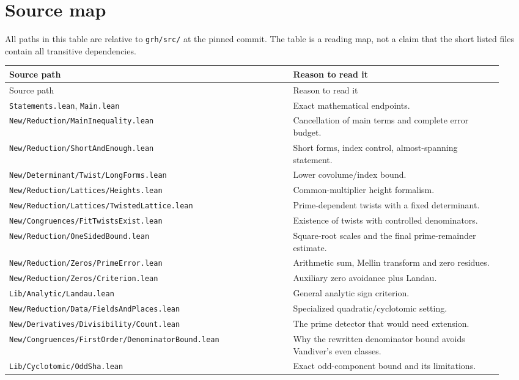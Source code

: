 \documentclass[11pt,letterpaper]{article}
\theoremstyle{definition}\newtheorem{definition}[theorem]{Definition}
\theoremstyle{remark}\newtheorem{remark}[theorem]{Remark}
\newcommand{\src}[1]{\nolinkurl{#1}}
\begin{document}
\appendix
\section{Source map}
All paths in this table are relative to \src{grh/src/} at the pinned commit. The table is a
reading map, not a claim that the short listed files contain all transitive dependencies.
\begin{longtable}{P{0.54\linewidth}P{0.40\linewidth}}
\toprule Source path & Reason to read it\\\midrule\endfirsthead
\toprule Source path & Reason to read it\\\midrule\endhead
\src{Statements.lean}, \src{Main.lean} & Exact mathematical endpoints.\\[4pt]
\src{New/Reduction/MainInequality.lean} & Cancellation of main terms and complete error budget.\\[4pt]
\src{New/Reduction/ShortAndEnough.lean} & Short forms, index control, almost-spanning statement.\\[4pt]
\src{New/Determinant/Twist/LongForms.lean} & Lower covolume/index bound.\\[4pt]
\src{New/Reduction/Lattices/Heights.lean} & Common-multiplier height formalism.\\[4pt]
\src{New/Reduction/Lattices/TwistedLattice.lean} & Prime-dependent twists with a fixed determinant.\\[4pt]
\src{New/Congruences/FitTwistsExist.lean} & Existence of twists with controlled denominators.\\[4pt]
\src{New/Reduction/OneSidedBound.lean} & Square-root scales and the final prime-remainder estimate.\\[4pt]
\src{New/Reduction/Zeros/PrimeError.lean} & Arithmetic sum, Mellin transform and zero residues.\\[4pt]
\src{New/Reduction/Zeros/Criterion.lean} & Auxiliary zero avoidance plus Landau.\\[4pt]
\src{Lib/Analytic/Landau.lean} & General analytic sign criterion.\\[4pt]
\src{New/Reduction/Data/FieldsAndPlaces.lean} & Specialized quadratic/cyclotomic setting.\\[4pt]
\src{New/Derivatives/Divisibility/Count.lean} & The prime detector that would need extension.\\[4pt]
\src{New/Congruences/FirstOrder/DenominatorBound.lean} & Why the rewritten denominator bound avoids Vandiver's even classes.\\[4pt]
\src{Lib/Cyclotomic/OddSha.lean} & Exact odd-component bound and its limitations.\\
\bottomrule
\end{longtable}
\end{document}
